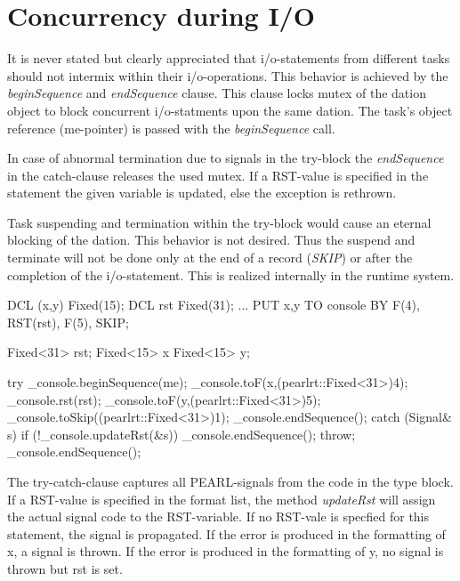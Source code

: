\section{Concurrency during I/O}
\label{ioconcurrency}
It is never stated but clearly appreciated that i/o-statements from
different tasks should not intermix within their i/o-operations.
This behavior is achieved by the {\em beginSequence} and 
{\em endSequence} clause. 
This clause locks mutex of the dation object to block concurrent
i/o-statments upon the same dation.
The task's object reference (me-pointer) is passed with
the {\em beginSequence} call.

In case of abnormal termination due to signals in the try-block
the {\em endSequence} in the catch-clause releases the used mutex.
If a RST-value is specified in the statement the given variable is
updated, else the exception is rethrown.

Task suspending and termination within the try-block would cause an
eternal blocking of the dation. 
This behavior is not desired.
Thus the suspend and terminate will not be done only at the end of a record
({\em SKIP}) or after the completion of the i/o-statement.
This is realized internally in the runtime system.

\begin{PEARLCode}
DCL (x,y) Fixed(15);
DCL rst Fixed(31);
...
PUT x,y TO console BY F(4), RST(rst), F(5), SKIP;
\end{PEARLCode}

\begin{CppCode}
Fixed<31> rst;
Fixed<15> x
Fixed<15> y;

try {
   _console.beginSequence(me);
   _console.toF(x,(pearlrt::Fixed<31>)4);
   _console.rst(rst);
   _console.toF(y,(pearlrt::Fixed<31>)5);
   _console.toSkip((pearlrt::Fixed<31>)1);
   _console.endSequence();
} catch (Signal& s) {
   if (!_console.updateRst(&s)) {
      _console.endSequence();
      throw;
   }
   _console.endSequence();
}
\end{CppCode}

The try-catch-clause captures all PEARL-signals from the code in the 
type block. If a RST-value is specified in the format list, the method
{\em updateRst} will assign the actual signal code to the RST-variable.
If no RST-vale is specfied for this statement, the signal is propagated.
If the error is produced in the formatting of x, a signal is thrown.
If the error is produced in the formatting of y, no signal is thrown but rst
is set.

